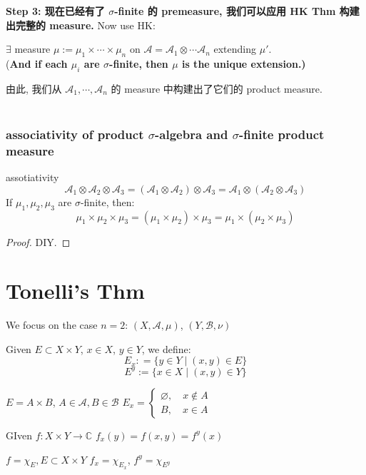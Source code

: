 \documentclass[lang=cn,11pt]{elegantbook}
\begin{document}
\textbf{Step 3: 现在已经有了 $\sigma$-finite 的 premeasure, 我们可以应用 HK Thm 构建出完整的 measure.}
Now use HK:
\begin{corollary}
    $\exists$ measure $\mu := \mu_1 \times \cdots \times \mu_n$ on $\mathcal{A} = \mathcal{A}_1 \otimes \cdots \mathcal{A}_n$ extending $\mu'$.\\
    (\textbf{And if each $\mu_i $ are $\sigma$-finite, then $\mu$ is the unique extension.)}
\end{corollary}
由此, 我们从 $\mathcal{A}_1 , \cdots ,\mathcal{A}_n$ 的 measure 中构建出了它们的 product measure.\\\\


\subsection{associativity of product $\sigma$-algebra and $\sigma$-finite product measure}
\begin{corollary}{assotiativity}
$$ \mathcal{A}_1 \otimes \mathcal{A}_2  \otimes \mathcal{A}_3 =  (\mathcal{A}_1 \otimes \mathcal{A}_2)  \otimes \mathcal{A}_3 =   \mathcal{A}_1 \otimes (\mathcal{A}_2  \otimes \mathcal{A}_3 ) $$
If $\mu_1, \mu_2,\mu_3$ are $\sigma$-finite, then: $$\mu_1 \times \mu_2 \times \mu_3 = (\mu_1 \times \mu_2) \times \mu_3  = \mu_1 \times (\mu_2 \times \mu_3 )$$
\end{corollary}
\begin{proof}
    DIY.    
\end{proof}







\chapter{Tonelli's Thm}

We focus on the case $n=2$: $(X,\mathcal{A}, \mu)$, $(Y, \mathcal{B}, \nu)$

\begin{definition}
    Given $E \subset X \times Y$, $x \in X$, $y\in Y$, we define:
\[E_x : = \{  y\in Y \mid (x,y) \in E \}\]
\[
E^y := \{x\in X \mid (x,y) \in Y  \}
\]
\end{definition}


\begin{example}
    $E = A \times B $, $A \in \mathcal{A}, B \in \mathcal{B}$
    $E_x = \begin{cases}
        \varnothing ,\quad x\not\in A \\
        B ,\quad x\in A
    \end{cases}$


GIven $f: X \times Y \to \mathbb{C}$
$f_x(y) =  f(x,y) = f^y(x)$


$f = \chi_E, E \subset X \times Y$
$f_x = \chi_{E_x}$, $f^y = \chi_{E^y}$
\end{example}
\end{document}
